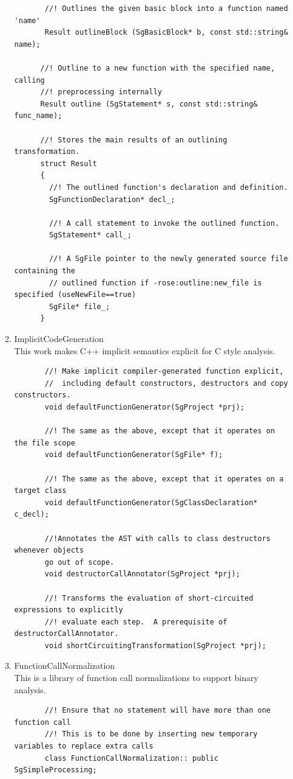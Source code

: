 \begin{enumerate}
\begin{enumerate}
\begin{lstlisting}
       //! Outlines the given basic block into a function named 'name'
       Result outlineBlock (SgBasicBlock* b, const std::string& name);

      //! Outline to a new function with the specified name, calling 
      //! preprocessing internally
      Result outline (SgStatement* s, const std::string& func_name);

      //! Stores the main results of an outlining transformation.
      struct Result
      {
        //! The outlined function's declaration and definition.
        SgFunctionDeclaration* decl_;
      
        //! A call statement to invoke the outlined function.
        SgStatement* call_;
      
        //! A SgFile pointer to the newly generated source file containing the
        // outlined function if -rose:outline:new_file is specified (useNewFile==true)
        SgFile* file_;
      }
       \end{lstlisting}

      \item ImplicitCodeGeneration \\
            This work makes C++ implicit semantics explicit for C style analysis.
       \begin{lstlisting}
       //! Make implicit compiler-generated function explicit,
       //  including default constructors, destructors and copy constructors.
       void defaultFunctionGenerator(SgProject *prj);

       //! The same as the above, except that it operates on the file scope
       void defaultFunctionGenerator(SgFile* f);

       //! The same as the above, except that it operates on a target class
       void defaultFunctionGenerator(SgClassDeclaration* c_decl);

       //!Annotates the AST with calls to class destructors whenever objects
       go out of scope.
       void destructorCallAnnotator(SgProject *prj);

       //! Transforms the evaluation of short-circuited expressions to explicitly
       //! evaluate each step.  A prerequisite of destructorCallAnnotator.
       void shortCircuitingTransformation(SgProject *prj);

       \end{lstlisting}
      

      \item FunctionCallNormalization \\
            This is a library of function call normalizations to support binary
            analysis.
       \begin{lstlisting}
       //! Ensure that no statement will have more than one function call
       //! This is to be done by inserting new temporary variables to replace extra calls
       class FunctionCallNormalization:: public SgSimpleProcessing; 
       \end{lstlisting}


\end{enumerate}
\end{enumerate}
